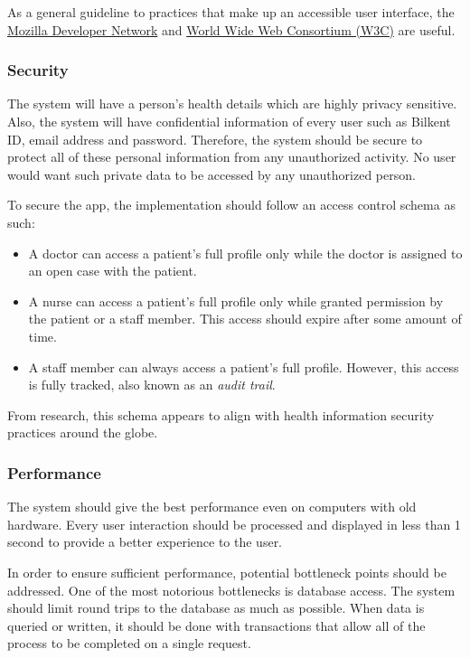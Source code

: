 \documentclass[a4paper, 12pt, titlepage]{article}
\begin{document}
  As a general guideline to practices that make up an accessible user interface,
  the \href{https://developer.mozilla.org/en-US/docs/Web/Accessibility}{Mozilla Developer Network} and
  \href{https://www.w3.org/standards/webdesign/accessibility}{World Wide Web Consortium (W3C)} are useful.

  \subsubsection{Security}

  The system will have a person's health details which are highly privacy sensitive.
  Also, the system will have confidential information of every user such as Bilkent ID,
  email address and password. Therefore, the system should be secure to protect
  all of these personal information from any unauthorized activity.
  No user would want such private data to be accessed by any unauthorized person.

  To secure the app, the implementation should follow an access control schema as such:

  \begin{itemize}
    \item A doctor can access a patient's full profile only while the doctor is assigned to an open case with the patient.
    \item A nurse can access a patient's full profile only while granted permission by the patient or a staff member.
      This access should expire after some amount of time.
    \item A staff member can always access a patient's full profile.
      However, this access is fully tracked, also known as an \textit{audit trail}.
  \end{itemize}

  From research, this schema appears to align with health information security practices around the globe.

  \subsubsection{Performance}

  The system should give the best performance even on computers with old hardware.
  Every user interaction should be processed and displayed in less than 1 second to provide
  a better experience to the user.

  In order to ensure sufficient performance, potential bottleneck points should be addressed.
  One of the most notorious bottlenecks is database access.
  The system should limit round trips to the database as much as possible.
  When data is queried or written, it should be done with transactions that allow all of the process to be completed
  on a single request.
\end{document}
